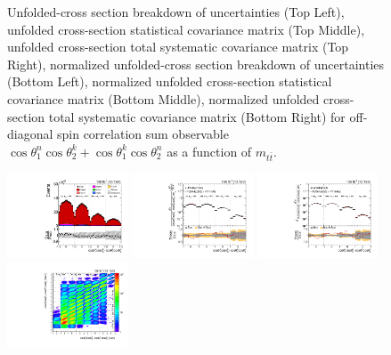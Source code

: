 \begin{figure}[htb]
\begin{center}
\caption{Unfolded-cross section breakdown of uncertainties (Top Left), unfolded cross-section statistical covariance matrix (Top Middle), unfolded cross-section total systematic covariance matrix (Top Right), normalized unfolded-cross section breakdown of uncertainties (Bottom Left), normalized unfolded cross-section statistical covariance matrix (Bottom Middle), normalized unfolded cross-section total systematic covariance matrix (Bottom Right) for off-diagonal spin correlation sum observable $\cos\theta_{1}^{n}\cos\theta_{2}^{k}+\cos\theta_{1}^{k}\cos\theta_{2}^{n}$ as a function of $m_{t\bar{t}}$.}
\label{fig:c_Pnk_mttbar_uncertainties}
\end{center}
\end{figure}
\clearpage
\begin{figure}[htb]
\begin{center}
 \includegraphics[width=0.32\textwidth]{fig_fullRun2UL/controlplots/combined/Hyp_LLBarCMnk_vs_TTBarMass.pdf}
 \includegraphics[width=0.32\textwidth]{fig_fullRun2UL/unfolding/combined/UnfoldedResults_c_Mnk_mttbar.pdf}
 \includegraphics[width=0.32\textwidth]{fig_fullRun2UL/unfolding/combined/UnfoldedResultsNorm_c_Mnk_mttbar.pdf} \\
 \includegraphics[width=0.32\textwidth]{fig_fullRun2UL/unfolding/combined/ResponseMatrix_c_Mnk_mttbar.pdf}

\end{center}
\end{figure}
